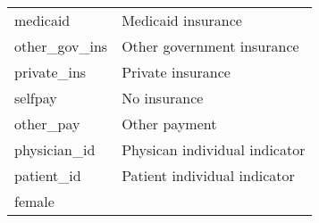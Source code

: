 \documentclass[
]{book}
\begin{document}
\begin{longtable}[]{@{}ll@{}}
\begin{minipage}[t]{0.18\columnwidth}
medicaid\strut
\end{minipage} & \begin{minipage}[t]{0.76\columnwidth}\raggedright
Medicaid insurance\strut
\end{minipage}\tabularnewline
\begin{minipage}[t]{0.18\columnwidth}\raggedright
other\_gov\_ins\strut
\end{minipage} & \begin{minipage}[t]{0.76\columnwidth}\raggedright
Other government insurance\strut
\end{minipage}\tabularnewline
\begin{minipage}[t]{0.18\columnwidth}\raggedright
private\_ins\strut
\end{minipage} & \begin{minipage}[t]{0.76\columnwidth}\raggedright
Private insurance\strut
\end{minipage}\tabularnewline
\begin{minipage}[t]{0.18\columnwidth}\raggedright
selfpay\strut
\end{minipage} & \begin{minipage}[t]{0.76\columnwidth}\raggedright
No insurance\strut
\end{minipage}\tabularnewline
\begin{minipage}[t]{0.18\columnwidth}\raggedright
other\_pay\strut
\end{minipage} & \begin{minipage}[t]{0.76\columnwidth}\raggedright
Other payment\strut
\end{minipage}\tabularnewline
\begin{minipage}[t]{0.18\columnwidth}\raggedright
physician\_id\strut
\end{minipage} & \begin{minipage}[t]{0.76\columnwidth}\raggedright
Physican individual indicator\strut
\end{minipage}\tabularnewline
\begin{minipage}[t]{0.18\columnwidth}\raggedright
patient\_id\strut
\end{minipage} & \begin{minipage}[t]{0.76\columnwidth}\raggedright
Patient individual indicator\strut
\end{minipage}\tabularnewline
\begin{minipage}[t]{0.18\columnwidth}\raggedright
female\strut
\end{minipage} & \begin{minipage}[t]{0.76\columnwidth}\raggedright

\end{minipage}
\end{longtable}
\end{document}
